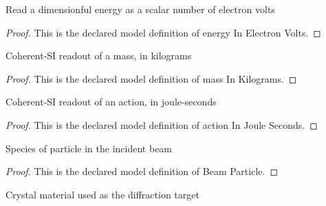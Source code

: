\begin{definition}
  \label{def:physics:phyx-mini-0532:phyxminiproblems-problemphyxmini0532-energyinelectronvolts}
  Read a dimensionful energy as a scalar number of electron volts
\end{definition}
\begin{proof}
  This is the declared model definition of energy In Electron Volts.
\end{proof}
\begin{definition}
  \label{def:physics:phyx-mini-0532:phyxminiproblems-problemphyxmini0532-massinkilograms}
  Coherent-SI readout of a mass, in kilograms
\end{definition}
\begin{proof}
  This is the declared model definition of mass In Kilograms.
\end{proof}
\begin{definition}
  \label{def:physics:phyx-mini-0532:phyxminiproblems-problemphyxmini0532-actioninjouleseconds}
  Coherent-SI readout of an action, in joule-seconds
\end{definition}
\begin{proof}
  This is the declared model definition of action In Joule Seconds.
\end{proof}
\begin{definition}
  \label{def:physics:phyx-mini-0532:phyxminiproblems-problemphyxmini0532-beamparticle}
  Species of particle in the incident beam
\end{definition}
\begin{proof}
  This is the declared model definition of Beam Particle.
\end{proof}
\begin{definition}
  \label{def:physics:phyx-mini-0532:phyxminiproblems-problemphyxmini0532-crystalmaterial}
  Crystal material used as the diffraction target
\end{definition}
